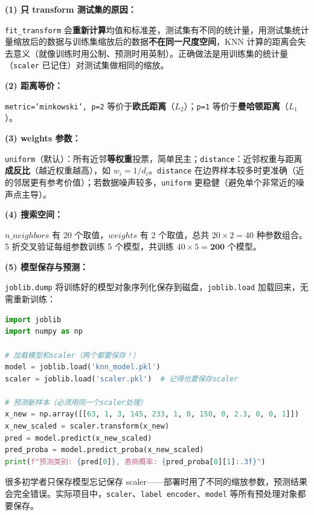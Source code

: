 \documentclass[a4paper,11pt]{ctexart}
\begin{document}
\begin{solutionbox}[参考答案与详细解析]
    \textbf{(1) 只 transform 测试集的原因：}

    \texttt{fit\_transform} 会\textbf{重新计算}均值和标准差，测试集有不同的统计量，用测试集统计量缩放后的数据与训练集缩放后的数据\textbf{不在同一尺度空间}，KNN 计算的距离会失去意义（就像训练时用公制、预测时用英制）。正确做法是用训练集的统计量（\texttt{scaler} 已记住）对测试集做相同的缩放。

    \textbf{(2) 距离等价：}

    \texttt{metric='minkowski', p=2} 等价于\textbf{欧氏距离}（$L_2$）；\texttt{p=1} 等价于\textbf{曼哈顿距离}（$L_1$）。

    \textbf{(3) weights 参数：}

    \texttt{uniform}（默认）：所有近邻\textbf{等权重}投票，简单民主；\texttt{distance}：近邻权重与距离\textbf{成反比}（越近权重越高），如 $w_i = 1/d_i$。\texttt{distance} 在边界样本较多时更准确（近的邻居更有参考价值）；若数据噪声较多，\texttt{uniform} 更稳健（避免单个非常近的噪声点主导）。

    \textbf{(4) 搜索空间：}

    $n\_neighbors$ 有 20 个取值，$weights$ 有 2 个取值，总共 $20 \times 2 = 40$ 种参数组合。5 折交叉验证每组参数训练 5 个模型，共训练 $40 \times 5 = \mathbf{200}$ 个模型。

    \textbf{(5) 模型保存与预测：}

    \texttt{joblib.dump} 将训练好的模型对象序列化保存到磁盘，\texttt{joblib.load} 加载回来，无需重新训练：
    \begin{lstlisting}[language=Python]
import joblib
import numpy as np

# 加载模型和scaler（两个都要保存！）
model = joblib.load('knn_model.pkl')
scaler = joblib.load('scaler.pkl')  # 记得也要保存scaler

# 预测新样本（必须用同一个scaler处理）
x_new = np.array([[63, 1, 3, 145, 233, 1, 0, 150, 0, 2.3, 0, 0, 1]])
x_new_scaled = scaler.transform(x_new)
pred = model.predict(x_new_scaled)
pred_proba = model.predict_proba(x_new_scaled)
print(f"预测类别: {pred[0]}, 患病概率: {pred_proba[0][1]:.3f}")
    \end{lstlisting}

    \begin{keybox}
        很多初学者只保存模型忘记保存 scaler——部署时用了不同的缩放参数，预测结果会完全错误。实际项目中，\texttt{scaler}、\texttt{label encoder}、\texttt{model} 等所有预处理对象都要保存。
    \end{keybox}
\end{solutionbox}
\end{document}
